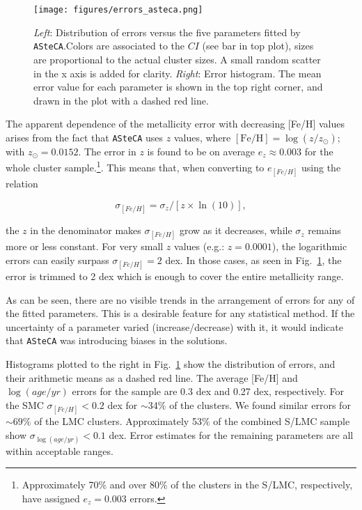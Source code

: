 \documentclass{aa}
\begin{document}
\begin{figure}[h!]
\centering
\texttt{[image: figures/errors\_asteca.png]}
\caption{\emph{Left}: Distribution of errors versus the five parameters fitted
by \texttt{ASteCA}.\@ Colors are associated to the $CI$ (see bar in top plot),
sizes are proportional to the actual cluster sizes. A small random scatter in
the x axis is added for clarity.
\emph{Right}: Error histogram. The mean error value for each parameter is shown
in the top right corner, and drawn in the plot with a dashed red line.}
\label{fig:errors}
\end{figure}

The apparent dependence of the metallicity error with decreasing [Fe/H] values
arises from the fact that \texttt{ASteCA} uses $z$ values, where
$\mathrm{[Fe/H]}{=}\log(z/z_{\odot})$; with $z_{\odot}{=}0.0152$.
The error in $z$ is found to be on average $e_z{\approx}0.003$ for the whole
cluster sample.\footnote{Approximately 70\% and over 80\% of the clusters in the
S/LMC, respectively, have assigned $e_z{=}0.003$ errors.}. This means that, when
converting to $e_{[Fe/H]}$ using the relation

\begin{equation}
\sigma_{[Fe/H]} = \sigma_z/[z\times\ln(10)],
\end{equation}

\noindent the $z$ in the denominator makes $\sigma_{[Fe/H]}$ grow as it
decreases, while $\sigma_z$ remains more or less constant.
For very small $z$ values (e.g.: $z{=}0.0001$), the
logarithmic errors can easily surpass $\sigma_{[Fe/H]}{=}2$ dex. In those cases,
as seen in Fig.~\ref{fig:errors}, the error is trimmed to 2 dex which is
enough to cover the entire metallicity range.

As can be seen, there are no visible trends in the arrangement of errors for any
of the fitted parameters. This is a desirable feature for any statistical
method. If the uncertainty of a parameter varied (increase/decrease) with it, it
would indicate that \texttt{ASteCA} was introducing biases in the solutions.

Histograms plotted to the right in Fig.~\ref{fig:errors} show the distribution
of errors, and their arithmetic means as a dashed red line.
The average [Fe/H] and $\log(age/yr)$ errors for the sample are 0.3 dex and
0.27 dex, respectively. For the SMC $\sigma_{[Fe/H]}{<}0.2$ dex for $\sim$34\%
of the clusters. We found similar errors for ${\sim}69\%$ of the LMC clusters.
Approximately 53\% of the combined S/LMC sample show
$\sigma_{\log(age/yr)}{<}0.1$ dex. Error estimates for the remaining parameters
are all within acceptable ranges.\\
\end{document}
